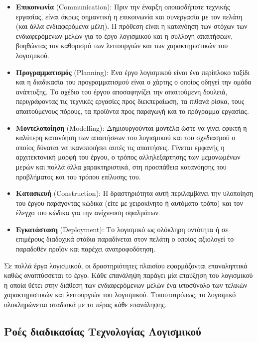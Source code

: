 \begin{itemize}
    \item \textbf{Επικοινωνία} (Communication): Πριν την έναρξη οποιασδήποτε τεχνικής εργασίας, είναι άκρως σημαντική η επικοινωνία και συνεργασία με τον πελάτη (και άλλα ενδιαφερόμενα μέλη). Η πρόθεση είναι η κατανόηση των στόχων των ενδιαφερόμενων μελών για το έργο λογισμικού και η συλλογή απαιτήσεων, βοηθώντας τον καθορισμό των λειτουργιών και των χαρακτηριστικών του λογισμικού.
    \item \textbf{Προγραμματισμός} (Planning): Ένα έργο λογισμικού είναι ένα περίπλοκο ταξίδι και η διαδικασία του προγραμματισμού είναι ο χάρτης ο οποίος οδηγεί την ομάδα ανάπτυξης. Το σχέδιο του έργου αποσαφηνίζει την απαιτούμενη δουλειά, περιγράφοντας τις τεχνικές εργασίες προς διεκπεραίωση, τα πιθανά ρίσκα, τους απαιτούμενους πόρους, τα προϊόντα προς παραγωγή και το πρόγραμμα εργασίας. 
    \item \textbf{Μοντελοποίηση} (Modelling): Δημιουργούνται μοντέλα ώστε να γίνει εφικτή η καλύτερη κατανόηση των απαιτήσεων του λογισμικού και του σχεδιασμού ο οποίος δύναται να ικανοποιήσει αυτές τις απαιτήσεις. Γίνεται εμφανής η αρχιτεκτονική μορφή του έργου, ο τρόπος αλληλεξάρτησης των μεμονωμένων μερών και πολλά άλλα χαρακτηριστικά, στη προσπάθεια κατανόησης του προβλήματος και του τρόπου επίλυσης του.
    \item \textbf{Κατασκευή} (Construction): Η δραστηριότητα αυτή περιλαμβάνει την υλοποίηση του έργου παράγοντας κώδικα (είτε με χειροκίνητο ή αυτόματο τρόπο) και τον έλεγχο του κώδικα για την ανίχνευση σφαλμάτων. 
    \item \textbf{Εγκατάσταση} (Deployment): Το λογισμικό ως ολόκληρη οντότητα ή σε επιμέρους διαδοχικά στάδια παραδίνεται στον πελάτη ο οποίος αξιολογεί το παραδοθέν προϊόν και παρέχει ανατροφοδότηση.
\end{itemize}

Σε πολλά έργα λογισμικού, οι δραστηριότητες πλαισίου εφαρμόζονται επαναληπτικά καθώς αναπτύσσεται το έργο. Κάθε επανάληψη παράγει μία επαύξηση του λογισμικού η οποία θέτει στην διάθεση των ενδιαφερόμενων μελών ένα υποσύνολο των τελικών χαρακτηριστικών και λειτουργιών του λογισμικού. Τοιουτοτρόπως, το λογισμικό ολοκληρώνεται σταδιακά με το πέρας κάθε επανάληψης. 

\subsection{Ροές διαδικασίας Τεχνολογίας Λογισμικού}

